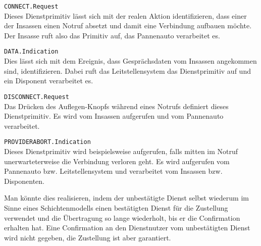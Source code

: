 \documentclass{../exercisesheet}
\begin{document}
\begin{exercise}{2}
	\begin{subexercise} \texttt{CONNECT.Request}\\
		Dieses Dienstprimitiv lässt sich mit der realen Aktion identifizieren, dass einer der Insassen einen Notruf absetzt und damit eine Verbindung aufbauen möchte. Der
		Insasse ruft also das Primitiv auf, das Pannenauto verarbeitet es.
	\end{subexercise}

	\begin{subexercise} \texttt{DATA.Indication}\\
		Dies lässt sich mit dem Ereignis, dass Gesprächsdaten vom Insassen angekommen sind, identifizieren. Dabei ruft das Leitstellensystem das Dienstprimitiv auf und
		ein Disponent verarbeitet es.
	\end{subexercise}

	\begin{subexercise} \texttt{DISCONNECT.Request}\\
		Das Drücken des Auflegen-Knopfs während eines Notrufs definiert dieses Dienstprimitiv. Es wird vom Insassen aufgerufen und vom Pannenauto verarbeitet.
	\end{subexercise}

	\begin{subexercise} \texttt{PROVIDERABORT.Indication}\\
		Dieses Dienstprimitiv wird beispielsweise aufgerufen, falls mitten im Notruf unerwarteterweise die Verbindung verloren geht. Es wird aufgerufen vom Pannenauto
		bzw. Leitstellensystem und verarbeitet vom Insassen bzw. Disponenten.
	\end{subexercise}
\end{exercise}

\begin{exercise}{1.5}
	Man könnte dies realisieren, indem der unbestätigte Dienst selbst wiederum im Sinne eines Schichtenmodells einen bestätigten Dienst für die Zustellung verwendet und die
	Übertragung so lange wiederholt, bis er die Confirmation erhalten hat. Eine Confirmation an den Dienstnutzer vom unbestätigten Dienst wird nicht gegeben, die Zustellung
	ist aber garantiert.\\
\end{exercise}

\begin{exercise}{3.5}
	\begin{subexercise}
		
	\end{subexercise}

	\begin{subexercise}
		  
	\end{subexercise}
\end{exercise}
\end{document}
